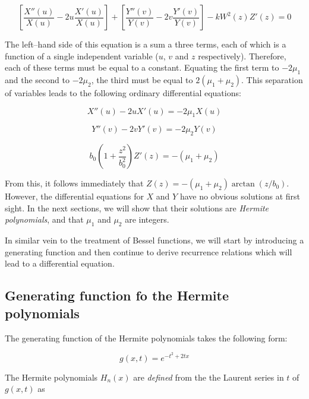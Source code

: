 \begin{equation}
\left[{\frac{X''(u)}{X(u)} - 2 u\frac{X'(u)}{X(u)}}\right] + 
\left[{\frac{Y''(v)}{Y(v)} - 2 v\frac{Y'(v)}{Y(v)}}\right] -kW^2(z)Z'(z) = 0
\end{equation} 

The left--hand side of this equation is a sum a three terms, each of which is a function of a single independent variable ($u$, $v$ and $z$ respectively). Therefore, each of these terms must be equal to a constant. Equating the first term to $-2\mu_1$ and the second to $-2\mu_2$, the third must be equal to $2(\mu_1+\mu_2)$. This separation of variables leads to the following ordinary differential equations:

\begin{equation}
X''(u) - 2 u X'(u) = - 2 \mu_1 X(u) \label{eq-diff-hermite-0}
\end{equation} 

\begin{equation}
Y''(v) - 2 v Y'(v) = - 2 \mu_2 Y(v)
\end{equation} 

\begin{equation}
b_0\left(1 + \frac{z^2}{b_0^2}\right)Z'(z) = -(\mu_1+\mu_2)
\end{equation} 

From this, it follows immediately that $Z(z) = -(\mu_1+\mu_2) \arctan(z/b_0)$. However, the differential equations for $X$ and $Y$ have no obvious solutions at first sight. In the next sections, we will show that their solutions are \emph{Hermite polynomials}, and that $\mu_1$ and $\mu_2$ are integers.

In similar vein to the treatment of Bessel functions, we will start by introducing a generating function and then continue to derive recurrence relations which will lead to a differential equation.

\subsection{Generating function fo the Hermite polynomials}

The generating function of the Hermite polynomials takes the following form:

\begin{equation}
g(x,t) = e^{-t^2 + 2tx} \label{eq-gen-hermite}
\end{equation}

The Hermite polynomials $H_n(x)$ are \emph{defined} from the the Laurent series in $t$ of $g(x,t)$ as 

